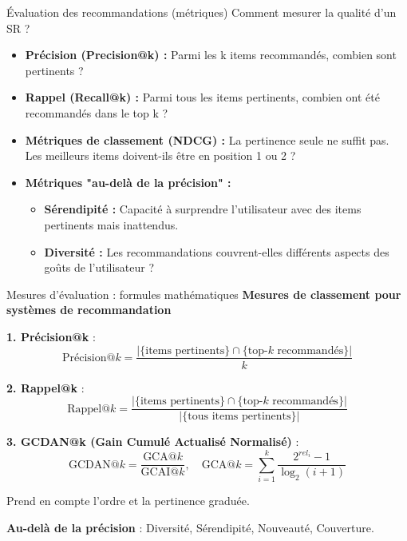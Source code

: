 \documentclass[9pt, aspectratio=169]{beamer}
\begin{document}
\begin{frame}{Évaluation des recommandations (métriques)}
    Comment mesurer la qualité d'un SR ?
    \begin{itemize}
        \item \textbf{Précision (Precision@k) :} Parmi les k items recommandés, combien sont pertinents ?
        \item \textbf{Rappel (Recall@k) :} Parmi tous les items pertinents, combien ont été recommandés dans le top k ?
        \item \textbf{Métriques de classement (NDCG) :} La pertinence seule ne suffit pas. Les meilleurs items doivent-ils être en position 1 ou 2 ?
        \item \textbf{Métriques "au-delà de la précision" :}
            \begin{itemize}
                \item \textbf{Sérendipité :} Capacité à surprendre l'utilisateur avec des items pertinents mais inattendus.
                \item \textbf{Diversité :} Les recommandations couvrent-elles différents aspects des goûts de l'utilisateur ?
            \end{itemize}
    \end{itemize}
\end{frame}

\begin{frame}{Mesures d'évaluation : formules mathématiques}
    \textbf{Mesures de classement pour systèmes de recommandation}
    
    \vspace{0.3cm}
    \textbf{1. Précision@k} :
    \[
    \text{Précision@}k = \frac{|\{\text{items pertinents}\} \cap \{\text{top-}k\text{ recommandés}\}|}{k}
    \]
    
    \textbf{2. Rappel@k} :
    \[
    \text{Rappel@}k = \frac{|\{\text{items pertinents}\} \cap \{\text{top-}k\text{ recommandés}\}|}{|\{\text{tous items pertinents}\}|}
    \]
    
    \textbf{3. GCDAN@k (Gain Cumulé Actualisé Normalisé)} :
    \[
    \text{GCDAN@}k = \frac{\text{GCA@}k}{\text{GCAI@}k}, \quad \text{GCA@}k = \sum_{i=1}^{k} \frac{2^{rel_i} - 1}{\log_2(i+1)}
    \]
    
    Prend en compte l'ordre et la pertinence graduée.
    
    \vspace{0.2cm}
    \textbf{Au-delà de la précision} : Diversité, Sérendipité, Nouveauté, Couverture.
\end{frame}
\end{document}
